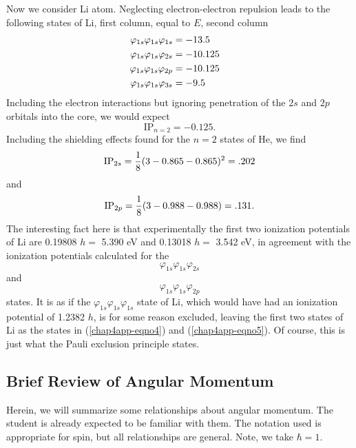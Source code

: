 {Now we consider Li atom. Neglecting electron-electron repulsion leads to the
following states of Li, first column, equal to $E$, second column
\begin{eqnarray}
\varphi_{1s} \varphi_{1s} \varphi_{1s} &= -13.5\cr
\varphi_{1s} \varphi_{1s} \varphi_{2s} &= -10.125\cr
\varphi_{1s} \varphi_{1s} \varphi_{2p} &= -10.125\cr
\varphi_{1s} \varphi_{1s} \varphi_{3s} &= -9.5\cr
\end{eqnarray}
Including the electron interactions but ignoring penetration of the $2s$ 
and $2p$ orbitals into the core, we would expect
\begin{equation}
\mathrm{IP}_{n=2} = - 0.125.
\end{equation}
Including the shielding effects found for the $n = 2$ states of He, we find
\begin{equation}
\mathrm{IP}_{2s} = {1 \over 8} ( 3 - 0.865 - 0.865 )^2 = .202
\end{equation}
and
\begin{equation}
\mathrm{IP}_{2p} = {1 \over 8} ( 3 - 0.988 - 0.988 ) = .131 .
\end{equation}
The interesting fact here is that experimentally the first two ionization 
potentials of Li are 0.19808 $h =$ 5.390 eV and 0.13018 $h =$ 3.542 eV, in 
agreement with the ionization potentials calculated for the
\begin{equation}
\varphi_{1s} \varphi_{1s} \varphi_{2s}
\label{chap4app-eqno4}
\end{equation}
and
\begin{equation}
\varphi_{1s} \varphi_{1s} \varphi_{2p} 
\label{chap4app-eqno5}
\end{equation}
states. It is as if the $\varphi_{1s} \varphi_{1s} \varphi_{1s}$ state of Li,
which would have had an ionization potential of 1.2382 $h$, is for some
reason excluded, leaving the first two states of Li as the states in
(\ref{chap4app-eqno4}) and (\ref{chap4app-eqno5}). Of course, this is
just what the Pauli exclusion principle states.

\subsection{Brief Review of Angular Momentum}
\label{chap4-app-b}

Herein, we will summarize some relationships about angular momentum.  The 
student is already  expected to be familiar with them.  The notation used 
is appropriate for spin, but all relationships are general.  Note, we 
take $\hbar = 1$.

}
